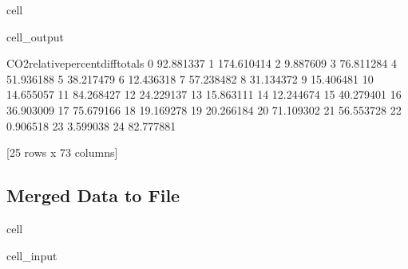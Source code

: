 \documentclass[letterpaper,10pt,english]{jupyterBook}
\begin{document}
\begin{sphinxuseclass}{cell}
\begin{sphinxVerbatimOutput}
\begin{sphinxuseclass}{cell_output}
\begin{sphinxVerbatim}[commandchars=\\\{\}]
    CO2\PYGZus{}relative\PYGZus{}percent\PYGZus{}diff\PYGZus{}totals  
0                         \PYGZhy{}92.881337  
1                        \PYGZhy{}174.610414  
2                          \PYGZhy{}9.887609  
3                          76.811284  
4                          51.936188  
5                         \PYGZhy{}38.217479  
6                          12.436318  
7                          57.238482  
8                          31.134372  
9                         \PYGZhy{}15.406481  
10                         14.655057  
11                         84.268427  
12                         24.229137  
13                        \PYGZhy{}15.863111  
14                         12.244674  
15                         40.279401  
16                        \PYGZhy{}36.903009  
17                         75.679166  
18                        \PYGZhy{}19.169278  
19                         20.266184  
20                        \PYGZhy{}71.109302  
21                         56.553728  
22                         \PYGZhy{}0.906518  
23                          3.599038  
24                         82.777881  

[25 rows x 73 columns]
\end{sphinxVerbatim}

\end{sphinxuseclass}\end{sphinxVerbatimOutput}

\end{sphinxuseclass}

\subsection{Merged Data to File}
\label{\detokenize{notebooks/data_exploration:merged-data-to-file}}
\begin{sphinxuseclass}{cell}\begin{sphinxVerbatimInput}

\begin{sphinxuseclass}{cell_input}
\begin{sphinxVerbatim}[commandchars=\\\{\}]
  

\end{sphinxVerbatim}

\end{sphinxuseclass}\end{sphinxVerbatimInput}

\end{sphinxuseclass}
\end{document}
